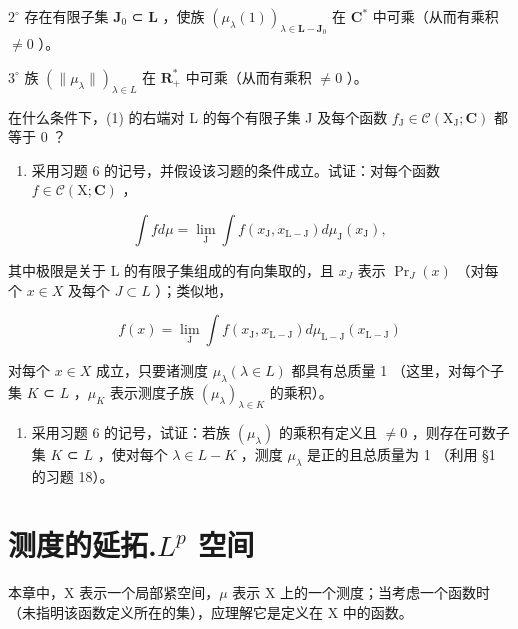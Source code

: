 \(2^{\circ}\) 存在有限子集 \(\mathbf{J}_0\) ⊂ \(\mathbf{L}\) ，使族 \((\mu_{\lambda}(1))_{\lambda \in \mathbf{L} - \mathbf{J}_0}\) 在 \(\mathbf{C}^*\) 中可乘（从而有乘积 \(\neq 0\) ）。

\(3^{\circ}\) 族 \((\| \mu_{\lambda}\|)_{\lambda \in L}\) 在 \(\mathbf{R}_{+}^{*}\) 中可乘（从而有乘积 \(\neq 0\) ）。

在什么条件下，(1) 的右端对 L 的每个有限子集 J 及每个函数 \(f_{\mathrm{J}} \in \mathcal{C}(\mathrm{X}_{\mathrm{J}}; \mathbf{C})\) 都等于 0 ？

\begin{enumerate}
\def\labelenumi{\arabic{enumi})}
\setcounter{enumi}{6}
\tightlist
\item
  采用习题 6 的记号，并假设该习题的条件成立。试证：对每个函数 \(f \in \mathcal{C}(\mathrm{X};\mathbf{C})\) ，
\end{enumerate}

\[
\int f d \mu = \lim _ {\mathrm{J}} \int f (x _ {\mathrm{J}}, x _ {\mathrm{L} - \mathrm{J}}) d \mu_ {\mathrm{J}} (x _ {\mathrm{J}}),
\]

其中极限是关于 L 的有限子集组成的有向集取的，且 \(x_{J}\) 表示 \(\Pr_{J}(x)\) （对每个 \(x \in X\) 及每个 \(J \subset L\) ）；类似地，

\[
f (x) = \lim _ {\mathrm{J}} \int f (x _ {\mathrm{J}}, x _ {\mathrm{L} - \mathrm{J}}) d \mu_ {\mathrm{L} - \mathrm{J}} (x _ {\mathrm{L} - \mathrm{J}})
\]

对每个 \(x \in X\) 成立，只要诸测度 \(\mu_{\lambda} (\lambda \in L)\) 都具有总质量 1 （这里，对每个子集 \(K\) ⊂ \(L\) ，\(\mu_{K}\) 表示测度子族 \((\mu_{\lambda})_{\lambda \in K}\) 的乘积）。

\begin{enumerate}
\def\labelenumi{\arabic{enumi})}
\setcounter{enumi}{7}
\tightlist
\item
  采用习题 6 的记号，试证：若族 \((\mu_{\lambda})\) 的乘积有定义且 \(\neq 0\) ，则存在可数子集 \(K\) ⊂ \(L\) ，使对每个 \(\lambda \in L - K\) ，测度 \(\mu_{\lambda}\) 是正的且总质量为 1 （利用 §1 的习题 18）。
\end{enumerate}

\chapter{\texorpdfstring{测度的延拓.\(L^{p}\) 空间}{测度的延拓.L to the p 空间}}

本章中，X 表示一个局部紧空间，\(\mu\) 表示 X 上的一个测度；当考虑一个函数时（未指明该函数定义所在的集），应理解它是定义在 X 中的函数。

